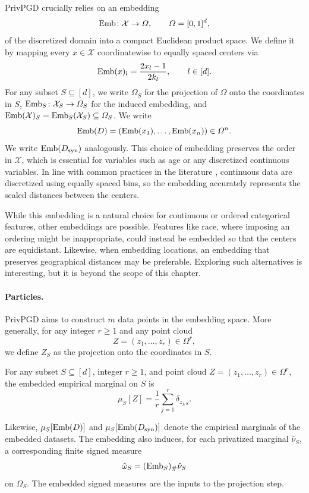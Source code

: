 PrivPGD crucially relies on an embedding
\[
  \operatorname{Emb}\colon \mathcal{X} \to \Omega,
  \qquad
  \Omega = [0,1]^d,
\]
of the discretized domain into a compact Euclidean product space. We define it by mapping every \(x \in \mathcal{X}\) coordinatewise to equally spaced centers via
\[
  \operatorname{Emb}(x)_l = \frac{2x_l - 1}{2k_l},
  \qquad l \in [d].
\]
For any subset \(S \subseteq [d]\), we write \(\Omega_S\) for the projection of \(\Omega\) onto the coordinates in \(S\), \(\operatorname{Emb}_S\colon \mathcal{X}_S \to \Omega_S\) for the induced embedding, and \(\operatorname{Emb}(\mathcal{X})_S = \operatorname{Emb}_S(\mathcal{X}_S) \subseteq \Omega_S\).
We write
\[
  \operatorname{Emb}(D) = (\operatorname{Emb}(x_1),\dots,\operatorname{Emb}(x_n)) \in \Omega^n.
\]
We write \(\operatorname{Emb}(D_{\mathrm{syn}})\) analogously.
This choice of embedding preserves the order in \(\mathcal{X}\), which is essential for variables such as age or any discretized continuous variables. In line with common practices in the literature \citep{mst,tao2021benchmarking}, continuous data are discretized using equally spaced bins, so the embedding accurately represents the scaled distances between the centers.

While this embedding is a natural choice for continuous or ordered categorical features, other embeddings are possible. Features like race, where imposing an ordering might be inappropriate, could instead be embedded so that the centers are equidistant. Likewise, when embedding locations, an embedding that preserves geographical distances may be preferable. Exploring such alternatives is interesting, but it is beyond the scope of this chapter.

\paragraph{Particles.}
PrivPGD aims to construct \(m\) data points in the embedding space. More generally, for any integer \(r \geq 1\) and any point cloud
\[
  Z = (z_1,\dots,z_r) \in \Omega^r,
\]
we define \(Z_S\) as the projection onto the coordinates in \(S\).

\begin{definition}
For any subset \(S \subseteq [d]\), integer \(r \geq 1\), and point cloud \(Z = (z_1,\dots,z_r) \in \Omega^r\), the embedded empirical marginal on \(S\) is
\[
  \mu_S[Z] = \frac{1}{r}\sum_{j=1}^r \delta_{z_{j,S}}.
\]
\end{definition}

Likewise, \(\mu_S[\operatorname{Emb}(D)]\) and \(\mu_S[\operatorname{Emb}(D_{\mathrm{syn}})]\) denote the empirical marginals of the embedded datasets.
The embedding also induces, for each privatized marginal \(\hat{\nu}_S\), a corresponding finite signed measure
\[
  \hat{\omega}_S = (\operatorname{Emb}_S)_{\#}\hat{\nu}_S
\]
on \(\Omega_S\). The embedded signed measures are the inputs to the projection step.

